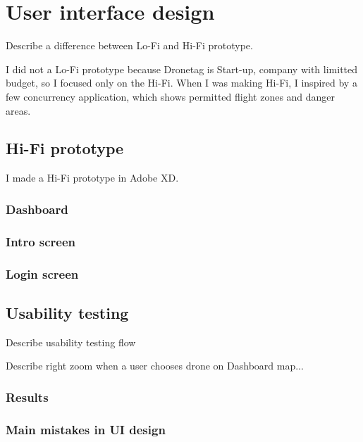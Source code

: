 \chapter{User interface design}

Describe a difference between Lo-Fi and Hi-Fi prototype.

I did not a Lo-Fi prototype because Dronetag is Start-up, company with limitted budget, so I focused only on the Hi-Fi. When I was making Hi-Fi, I inspired by a few concurrency application, which shows permitted flight zones and danger areas.
\section{Hi-Fi prototype}
I made a Hi-Fi prototype in Adobe XD.

\subsection{Dashboard}

\subsection{Intro screen}

\subsection{Login screen}

\section{Usability testing}
Describe usability testing flow

Describe right zoom when a user chooses drone on Dashboard map...

\subsection{Results}

\subsection{Main mistakes in UI design}